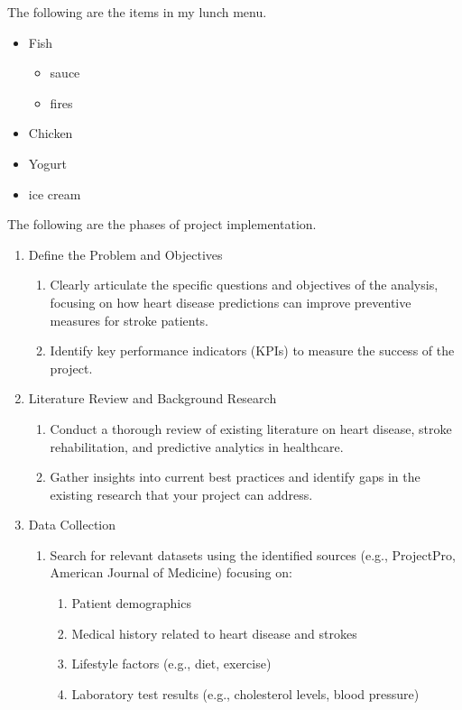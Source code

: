 \documentclass[runningheads]{llncs}
\begin{document}
The following are the items in my lunch menu.
\begin{itemize}
    \item Fish
    \begin{itemize}
        \item sauce
        \item fires
    \end{itemize}
    \item Chicken
    \item Yogurt
    \item ice cream
\end{itemize}


The following are the phases of project implementation. 
\begin{enumerate}
\item Define the Problem and Objectives
\begin{enumerate}
    \item Clearly articulate the specific questions and objectives of the analysis, focusing on how heart disease predictions can improve preventive measures for stroke patients.
    \item Identify key performance indicators (KPIs) to measure the success of the project. 
\end{enumerate}
\item  Literature Review and Background Research
\begin{enumerate}
    \item Conduct a thorough review of existing literature on heart disease, stroke rehabilitation, and predictive analytics in healthcare. 
    \item Gather insights into current best practices and identify gaps in the existing research that your project can address. 
\end{enumerate}
\item Data Collection
\begin{enumerate}
    \item Search for relevant datasets using the identified sources (e.g., ProjectPro, American Journal of Medicine) focusing on: 
    \begin{enumerate}
        \item Patient demographics 
        \item Medical history related to heart disease and strokes 
        \item Lifestyle factors (e.g., diet, exercise) 
        \item Laboratory test results (e.g., cholesterol levels, blood pressure) 

\end{enumerate}
\end{enumerate}
\end{enumerate}
\end{document}

